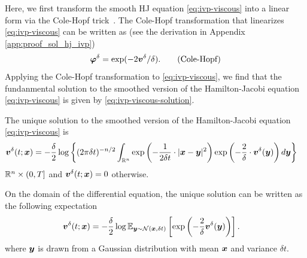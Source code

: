 Here, we first transform the smooth HJ equation \eqref{eq:ivp-viscous} into a linear form via the Cole-Hopf trick~\citet[\S 4.4.1]{EvansPDEBook}. The Cole-Hopf transformation that linearizes \eqref{eq:ivp-viscous} can be written as (see the derivation in Appendix \ref{app:proof_sol_hj_ivp}) 
%
\begin{align}
	\bm{\varphi}^\delta = \exp(-2\bm{v}^\delta/\delta).
	\label{eq:cole-hopf}
	\tag{Cole-Hopf}
\end{align}
%
Applying the Cole-Hopf transformation to  \eqref{eq:ivp-viscous}, we find that the fundanmental solution to the smoothed version of the Hamilton-Jacobi equation \eqref{eq:ivp-viscous} is given by \eqref{eq:ivp-viscous-solution}.
%
\begin{lemma}[Smoothed HJ Solution]
	The unique solution to the smoothed version of the Hamilton-Jacobi equation \eqref{eq:ivp-viscous} is
	\begin{align}
		\label{eq:ivp-viscous-solution}
		\bm{v}^\delta(t; \bm{x}) &= -\frac{\delta}{2} \log \bigg\{(2\pi\delta t)^{-n/2}\int_{\mathbb{R}^n} \exp \left(-\frac{1}{2\delta t}\cdot |\bm{x}-\bm{y}|^2\right) \exp \left(-\frac{2}{\delta}\cdot \bm{v}^\delta(\bm{y})\right) d\bm{y} \bigg\}
	\end{align}
	 $\mathbb{R}^n \times (0, T]$ and $\bm{v}^\delta(t; \bm{x}) = 0$ otherwise.
	\label{lemma:hj_solution}
\end{lemma}
%
\begin{corollary}
	On the domain of the differential equation, the unique solution can be written as the following expectation
	\begin{align}
		\bm{v}^\delta(t; \bm{x})&= -\frac{\delta}{2} \log \mathbb{E}_{\bm{y} \sim\mathcal{N}(\bm{x}, \delta t)}\left[\exp\left(-\dfrac{2}{\delta}\bm{v}^\delta(\bm{y})\right)\right].
		\label{eq:ivp-viscous-expectation}
	\end{align}
	where $\bm{y}$ is drawn from a Gaussian distribution with mean $\bm{x}$ and variance $\delta t$.
	\label{cor:expectation}
\end{corollary}
